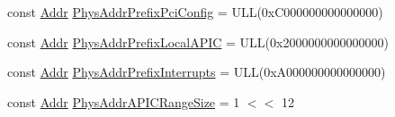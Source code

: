 \begin{DoxyCompactItemize}
const \hyperlink{base_2types_8hh_af1bb03d6a4ee096394a6749f0a169232}{Addr} \hyperlink{namespaceX86ISA_a384097e1e4d30dd3d5e988b21511cb1f}{PhysAddrPrefixPciConfig} = ULL(0xC000000000000000)
\item 
const \hyperlink{base_2types_8hh_af1bb03d6a4ee096394a6749f0a169232}{Addr} \hyperlink{namespaceX86ISA_a6e6995725a6652599b0ea37948213257}{PhysAddrPrefixLocalAPIC} = ULL(0x2000000000000000)
\item 
const \hyperlink{base_2types_8hh_af1bb03d6a4ee096394a6749f0a169232}{Addr} \hyperlink{namespaceX86ISA_a414f8fb2b512b76d435158e58038b0f8}{PhysAddrPrefixInterrupts} = ULL(0xA000000000000000)
\item 
const \hyperlink{base_2types_8hh_af1bb03d6a4ee096394a6749f0a169232}{Addr} \hyperlink{namespaceX86ISA_aca8409c60aba3dab705c6fa5fb51d987}{PhysAddrAPICRangeSize} = 1 $<$$<$ 12
\end{DoxyCompactItemize}
